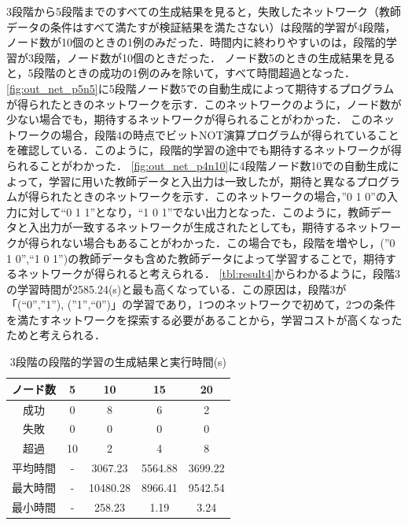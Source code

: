 \documentclass[exploratorypaper]{jsaiart} %
\begin{document}
3段階から5段階までのすべての生成結果を見ると，失敗したネットワーク（教師データの条件はすべて満たすが検証結果を満たさない）は段階的学習が4段階，ノード数が10個のときの1例のみだった．時間内に終わりやすいのは，段階的学習が3段階，ノード数が10個のときだった．
ノード数5のときの生成結果を見ると，5段階のときの成功の1例のみを除いて，すべて時間超過となった．\ref{fig:out_net_p5n5}に5段階ノード数5での自動生成によって期待するプログラムが得られたときのネットワークを示す．このネットワークのように，ノード数が少ない場合でも，期待するネットワークが得られることがわかった．
このネットワークの場合，段階4の時点でビットNOT演算プログラムが得られていることを確認している．このように，段階的学習の途中でも期待するネットワークが得られることがわかった．
\ref{fig:out_net_p4n10}に4段階ノード数10での自動生成によって，学習に用いた教師データと入出力は一致したが，期待と異なるプログラムが得られたときのネットワークを示す．このネットワークの場合，”0 1 0”の入力に対して“0 1 1”となり，“1 0 1”でない出力となった．このように，教師データと入出力が一致するネットワークが生成されたとしても，期待するネットワークが得られない場合もあることがわかった．この場合でも，段階を増やし，(”0 1 0”,“1 0 1”)の教師データも含めた教師データによって学習することで，期待するネットワークが得られると考えられる．
\ref{tbl:result4}からわかるように，段階3の学習時間が2585.24(s)と最も高くなっている．この原因は，段階3が「(“0”,”1”), (”1”,“0”)」の学習であり，1つのネットワークで初めて，2つの条件を満たすネットワークを探索する必要があることから，学習コストが高くなったためと考えられる．


\begin{table}[t]
\caption{3段階の段階的学習の生成結果と実行時間(s)}
\label{tbl:result1}
\begin{tabular}{c|cccc}
    ノード数&	5&	10&	15&	20\\
    \hline \hline
    成功&	0&	8&	6&	2\\
    失敗&	0&	0&	0&	0\\
    超過&	10&	2&	4&	8\\
    \hline
    平均時間&	- &	3067.23&	5564.88&	3699.22\\
    最大時間&	- &	10480.28&	8966.41&	9542.54\\
    最小時間&	- &	258.23&	1.19&	3.24\\
    \hline
\end{tabular}
\end{table}
\end{document}
